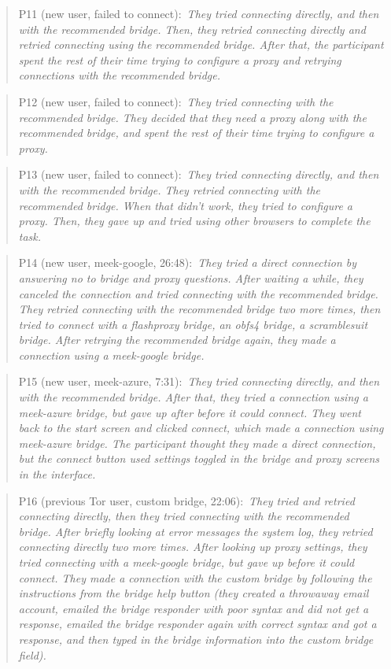 \documentclass[USenglish,oneside,twocolumn]{article}
\newcommand{\pquote}[2]{
\begin{quotation}
\noindent #1:~\textit{#2}
\end{quotation}
}
\begin{document}
\pquote{P11 (new user, failed to connect)}{They tried connecting directly, and then with the recommended bridge. Then, they retried connecting directly and retried connecting using the recommended bridge. After that, the participant spent the rest of their time trying to configure a proxy and retrying connections with the recommended bridge.}

\pquote{P12 (new user, failed to connect)}{They tried connecting with the recommended bridge. They decided that they need a proxy along with the recommended bridge, and spent the rest of their time trying to configure a proxy.}

\pquote{P13 (new user, failed to connect)}{They tried connecting directly, and then with the recommended bridge. They retried connecting with the recommended bridge. When that didn't work, they tried to configure a proxy. Then, they gave up and tried using other browsers to complete the task.}

\pquote{P14 (new user, meek-google, 26:48)}{They tried a direct connection by answering no to bridge and proxy questions. After waiting a while, they canceled the connection and tried connecting with the recommended bridge. They retried connecting with the recommended bridge two more times, then tried to connect with a flashproxy bridge, an obfs4 bridge, a scramblesuit bridge. After retrying the recommended bridge again, they made a connection using a meek-google bridge.}

\pquote{P15 (new user, meek-azure, 7:31)}{They tried connecting directly, and then with the recommended bridge. After that, they tried a connection using a meek-azure bridge, but gave up after before it could connect. They went back to the start screen and clicked connect, which made a connection using meek-azure bridge. The participant thought they made a direct connection, but the connect button used settings toggled in the bridge and proxy screens in the interface.}

\pquote{P16 (previous Tor user, custom bridge, 22:06)}{They tried and retried connecting directly, then they tried connecting with the recommended bridge. After briefly looking at error messages the system log, they retried connecting directly two more times. After looking up proxy settings, they tried connecting with a meek-google bridge, but gave up before it could connect. They made a connection with the custom bridge by following the instructions from the bridge help button (they created a throwaway email account, emailed the bridge responder with poor syntax and did not get a response, emailed the bridge responder again with correct syntax and got a response, and then typed in the bridge information into the custom bridge field).}
\end{document}
